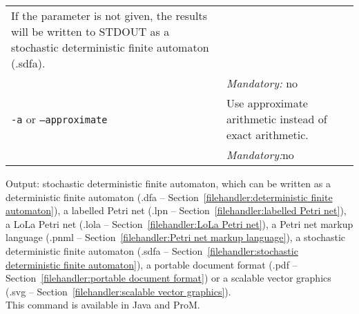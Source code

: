 {\begin{tabularx}{\linewidth}{lX}
If the parameter is not given, the results will be written to STDOUT as a stochastic deterministic finite automaton (.sdfa).\\
&\textit{Mandatory:} \quad no\\
\texttt{-a} or \texttt{--approximate} & Use approximate arithmetic instead of exact arithmetic.\\
&\textit{Mandatory:}\quad no\\
\bottomrule
\end{tabularx}
\noindent Output: stochastic deterministic finite automaton, which can be written as a deterministic finite automaton (.dfa -- Section~\ref{filehandler:deterministic finite automaton}), a labelled Petri net (.lpn -- Section~\ref{filehandler:labelled Petri net}), a LoLa Petri net (.lola -- Section~\ref{filehandler:LoLa Petri net}), a Petri net markup language (.pnml -- Section~\ref{filehandler:Petri net markup language}), a stochastic deterministic finite automaton (.sdfa -- Section~\ref{filehandler:stochastic deterministic finite automaton}), a portable document format (.pdf -- Section~\ref{filehandler:portable document format}) or a scalable vector graphics (.svg -- Section~\ref{filehandler:scalable vector graphics}).
\\This command is available in Java and ProM.
}
